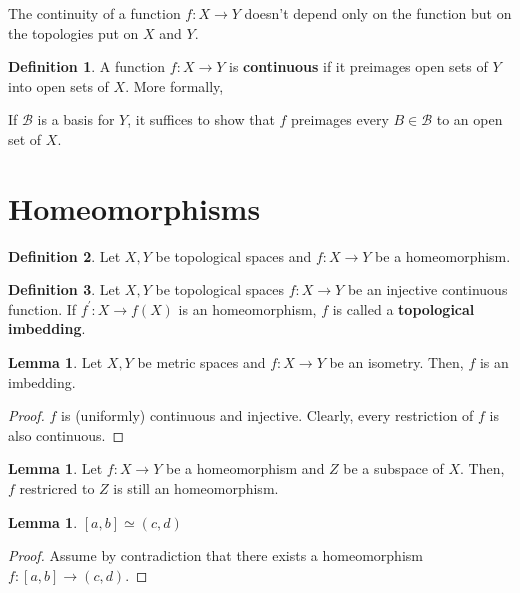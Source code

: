\documentclass{article}
\theoremstyle{definition}
\newtheorem{definition}{Definition}
\newtheorem{lemma}[theorem]{Lemma}
\begin{document}
The continuity of a function $f: X \xrightarrow{} Y$ doesn't depend only on the function
but on the topologies put on $X$ and $Y$.

\begin{definition}
    A function $f: X \xrightarrow{} Y$ is \textbf{continuous} if it preimages
    open sets of $Y$ into open sets of $X$. More formally, 
\end{definition}

If $\mathcal{B}$ is a basis for $Y$, it suffices to show that $f$ preimages
every $B \in \mathcal{B}$ to an open set of $X$.



\newpage

\section{Homeomorphisms}

\begin{definition}
    Let $X,Y$ be topological spaces and $f: X \xrightarrow{} Y$ be a homeomorphism.
\end{definition}

\begin{definition}
    Let $X,Y$ be topological spaces $f: X \xrightarrow{} Y$ be an
    injective continuous function. If $f^{\prime}: X \xrightarrow{} f(X)$
    is an homeomorphism, $f$ is called a \textbf{topological imbedding}.
\end{definition}

\begin{lemma}
    Let $X,Y$ be metric spaces and $f: X \xrightarrow{} Y$ be an isometry.
    Then, $f$ is an imbedding.
\end{lemma}
\begin{proof}
    $f$ is (uniformly) continuous and injective. Clearly, every restriction of
    $f$ is also continuous.
\end{proof}

\begin{lemma}
    Let $f: X \xrightarrow{} Y$ be a homeomorphism and $Z$ be a subspace of $X$.
    Then, $f$ restricred to $Z$ is still an homeomorphism.
\end{lemma}

\begin{lemma}
    $[a,b] \simeq (c,d)$
\end{lemma}
\begin{proof}
    Assume by contradiction that there exists a homeomorphism 
    $f: [a,b] \xrightarrow{} (c,d)$.


\end{proof}
\end{document}
